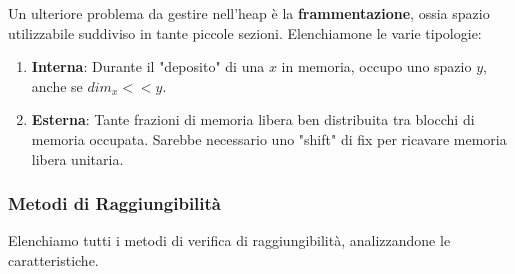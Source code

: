 \documentclass{article}
\begin{document}
Un ulteriore problema da gestire nell'heap è la \textbf{frammentazione}, ossia spazio utilizzabile suddiviso in tante piccole sezioni. Elenchiamone le varie tipologie:

\begin{enumerate}
    \item \textbf{Interna}: Durante il "deposito" di una $x$ in memoria, occupo uno spazio $y$, anche se $dim_{x} << y$.
    \item \textbf{Esterna}: Tante frazioni di memoria libera ben distribuita tra blocchi di memoria occupata. Sarebbe necessario uno "shift" di fix per ricavare memoria libera unitaria.
\end{enumerate}

\newpage

\subsubsection{Metodi di Raggiungibilità}

Elenchiamo tutti i metodi di verifica di raggiungibilità, analizzandone le caratteristiche.

\vspace*{10px}
\end{document}
